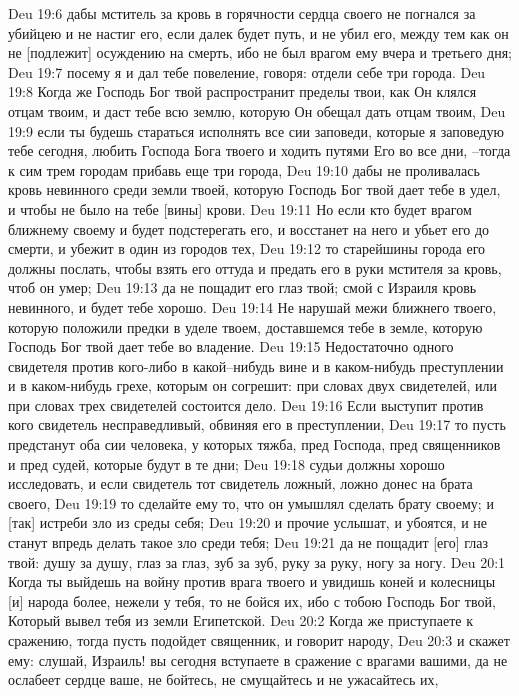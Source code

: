 Deu 19:6  дабы мститель за кровь в горячности сердца своего не погнался за убийцею и не настиг его, если далек будет путь, и не убил его, между тем как он не [подлежит] осуждению на смерть, ибо не был врагом ему вчера и третьего дня;
Deu 19:7  посему я и дал тебе повеление, говоря: отдели себе три города.
Deu 19:8  Когда же Господь Бог твой распространит пределы твои, как Он клялся отцам твоим, и даст тебе всю землю, которую Он обещал дать отцам твоим,
Deu 19:9  если ты будешь стараться исполнять все сии заповеди, которые я заповедую тебе сегодня, любить Господа Бога твоего и ходить путями Его во все дни, --тогда к сим трем городам прибавь еще три города,
Deu 19:10  дабы не проливалась кровь невинного среди земли твоей, которую Господь Бог твой дает тебе в удел, и чтобы не было на тебе [вины] крови.
Deu 19:11  Но если кто будет врагом ближнему своему и будет подстерегать его, и восстанет на него и убьет его до смерти, и убежит в один из городов тех,
Deu 19:12  то старейшины города его должны послать, чтобы взять его оттуда и предать его в руки мстителя за кровь, чтоб он умер;
Deu 19:13  да не пощадит его глаз твой; смой с Израиля кровь невинного, и будет тебе хорошо.
Deu 19:14  Не нарушай межи ближнего твоего, которую положили предки в уделе твоем, доставшемся тебе в земле, которую Господь Бог твой дает тебе во владение.
Deu 19:15  Недостаточно одного свидетеля против кого-либо в какой--нибудь вине и в каком-нибудь преступлении и в каком-нибудь грехе, которым он согрешит: при словах двух свидетелей, или при словах трех свидетелей состоится дело.
Deu 19:16  Если выступит против кого свидетель несправедливый, обвиняя его в преступлении,
Deu 19:17  то пусть предстанут оба сии человека, у которых тяжба, пред Господа, пред священников и пред судей, которые будут в те дни;
Deu 19:18  судьи должны хорошо исследовать, и если свидетель тот свидетель ложный, ложно донес на брата своего,
Deu 19:19  то сделайте ему то, что он умышлял сделать брату своему; и [так] истреби зло из среды себя;
Deu 19:20  и прочие услышат, и убоятся, и не станут впредь делать такое зло среди тебя;
Deu 19:21  да не пощадит [его] глаз твой: душу за душу, глаз за глаз, зуб за зуб, руку за руку, ногу за ногу.
Deu 20:1  Когда ты выйдешь на войну против врага твоего и увидишь коней и колесницы [и] народа более, нежели у тебя, то не бойся их, ибо с тобою Господь Бог твой, Который вывел тебя из земли Египетской.
Deu 20:2  Когда же приступаете к сражению, тогда пусть подойдет священник, и говорит народу,
Deu 20:3  и скажет ему: слушай, Израиль! вы сегодня вступаете в сражение с врагами вашими, да не ослабеет сердце ваше, не бойтесь, не смущайтесь и не ужасайтесь их,
